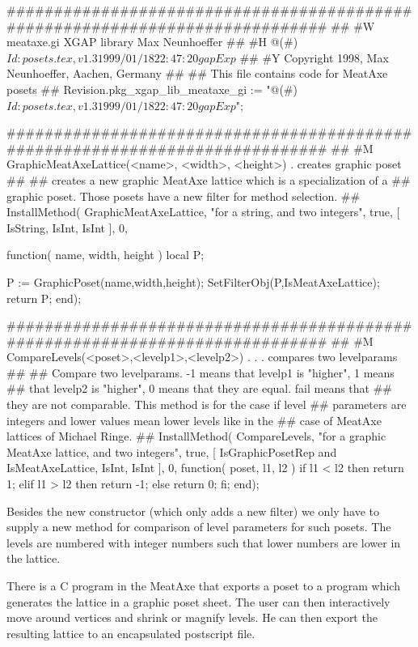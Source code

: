 \beginexample
#############################################################################
##
#W  meataxe.gi                  XGAP library                  Max Neunhoeffer
##
#H  @(#)$Id: posets.tex,v 1.3 1999/01/18 22:47:20 gap Exp $
##
#Y  Copyright 1998,       Max Neunhoeffer,              Aachen,       Germany
##
##  This file contains code for MeatAxe posets
##
Revision.pkg_xgap_lib_meataxe_gi :=
    "@(#)$Id: posets.tex,v 1.3 1999/01/18 22:47:20 gap Exp $";

#############################################################################
##
#M  GraphicMeatAxeLattice(<name>, <width>, <height>)  . creates graphic poset
##
##  creates a new graphic MeatAxe lattice which is a specialization of a
##  graphic poset. Those posets have a new filter for method selection.
##
InstallMethod( GraphicMeatAxeLattice,
    "for a string, and two integers",
    true,
    [ IsString,
      IsInt,
      IsInt ],
    0,

function( name, width, height )
  local P;

  P := GraphicPoset(name,width,height);
  SetFilterObj(P,IsMeatAxeLattice);
  return P;
end);

#############################################################################
##
#M  CompareLevels(<poset>,<levelp1>,<levelp2>) . . . compares two levelparams
##
##  Compare two levelparams. -1 means that levelp1 is "higher", 1 means
##  that levelp2 is "higher", 0 means that they are equal. fail means that
##  they are not comparable. This method is for the case if level
##  parameters are integers and lower values mean lower levels like in the
##  case of MeatAxe lattices of Michael Ringe.
##
InstallMethod( CompareLevels,
    "for a graphic MeatAxe lattice, and two integers",
    true,
    [ IsGraphicPosetRep and IsMeatAxeLattice, IsInt, IsInt ],
    0,
function( poset, l1, l2 )
  if l1 < l2 then
    return 1;
  elif l1 > l2 then
    return -1;
  else
    return 0;
  fi;
end);
\endexample

Besides the new constructor (which only adds a new filter) we only have to
supply a new method for comparison of level parameters for such posets. The 
levels are numbered with integer numbers such that lower numbers are lower
in the lattice.

There is a C program in the MeatAxe that exports a poset to a {\GAP}
program which generates the lattice in a graphic poset sheet. The user can
then interactively move around vertices and shrink or magnify levels. He
can then export the resulting lattice to an encapsulated postscript file.

